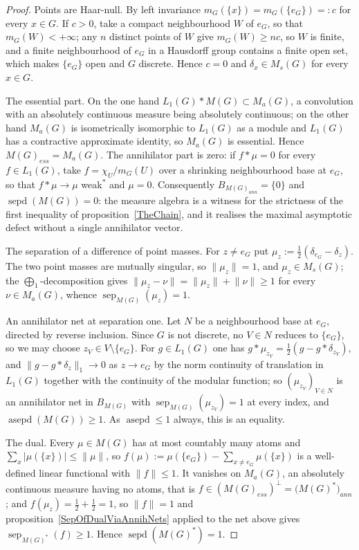 \documentclass[11pt]{article}
\theoremstyle{plain}
\theoremstyle{definition}
\newcommand{\convol}{\ast}
\DeclareMathOperator{\sep}{sep}
\DeclareMathOperator{\sepd}{sepd}
\DeclareMathOperator{\asepd}{asepd}
\begin{document}
\begin{proof}
Points are Haar-null. By left invariance $m_G( \{x \})=m_G( \{e_G \})=:c$ for
every $x\in G$. If $c>0$, take a compact neighbourhood $W$ of $e_G$, so that
$m_G(W)<+\infty$; any $n$ distinct points of $W$ give $m_G(W)\geq nc$, so $W$ is
finite, and a finite neighbourhood of $e_G$ in a Hausdorff group contains a
finite open set, which makes $ \{e_G \}$ open and $G$ discrete. Hence $c=0$ and
$\delta_x\in M_s(G)$ for every $x\in G$.

The essential part. On the one hand $L_1(G)\convol M(G)\subset M_a(G)$, a
convolution with an absolutely continuous measure being absolutely continuous; on
the other hand $M_a(G)$ is isometrically isomorphic to $L_1(G)$ as a module and
$L_1(G)$ has a contractive approximate identity, so $M_a(G)$ is essential. Hence
${M(G)}_{ess}=M_a(G)$. The annihilator part is zero: if $f\convol\mu=0$ for every
$f\in L_1(G)$, take $f=\chi_U/m_G(U)$ over a shrinking neighbourhood base at
$e_G$, so that $f\convol\mu\to\mu$ weak${}^*$ and $\mu=0$. Consequently
$B_{{M(G)}_{ann}}= \{0 \}$ and $\sepd(M(G))=0$: the measure algebra is a witness
for the strictness of the first inequality of proposition~\ref{TheChain}, and it
realises the maximal asymptotic defect without a single annihilator vector.

The separation of a difference of point masses. For $z\neq e_G$ put
$\mu_z:=\tfrac{1}{2}(\delta_{e_G}-\delta_z)$. The two point masses are mutually
singular, so $\lVert\mu_z\rVert=1$, and $\mu_z\in M_s(G)$; the
$\bigoplus_1$-decomposition gives
$\lVert\mu_z-\nu\rVert=\lVert\mu_z\rVert+\lVert\nu\rVert\geq 1$ for every
$\nu\in M_a(G)$, whence $\sep_{M(G)}(\mu_z)=1$.

An annihilator net at separation one. Let $N$ be a neighbourhood base at $e_G$,
directed by reverse inclusion. Since $G$ is not discrete, no $V\in N$ reduces to
$ \{e_G \}$, so we may choose $z_V\in V\setminus \{e_G \}$. For $g\in L_1(G)$ one
has $g\convol\mu_{z_V}=\tfrac{1}{2}(g-g\convol\delta_{z_V})$, and
$\lVert g-g\convol\delta_z\rVert_1\to 0$ as $z\to e_G$ by the norm continuity of
translation in $L_1(G)$ together with the continuity of the modular function; so
${(\mu_{z_V})}_{V\in N}$ is an annihilator net in $B_{M(G)}$ with
$\sep_{M(G)}(\mu_{z_V})=1$ at every index, and $\asepd(M(G))\geq 1$. As
$\asepd\leq 1$ always, this is an equality.

The dual. Every $\mu\in M(G)$ has at most countably many atoms and
$\sum_x|\mu( \{x \})|\leq\lVert\mu\rVert$, so
$f(\mu):=\mu( \{e_G \})-\sum_{x\neq e_G}\mu( \{x \})$ is a well-defined linear
functional with $\lVert f\rVert\leq 1$. It vanishes on $M_a(G)$, an absolutely
continuous measure having no atoms, that is
$f\in{({M(G)}_{ess})}^\perp={\bigl(M{(G)}^* \bigr)}_{ann}$; and
$f(\mu_z)=\tfrac{1}{2}+\tfrac{1}{2}=1$, so $\lVert f\rVert=1$ and
proposition~\ref{SepOfDualViaAnnihNets} applied to the net above gives
$\sep_{M{(G)}^*}(f)\geq 1$. Hence $\sepd(M{(G)}^*)=1$.
\end{proof}
\end{document}
